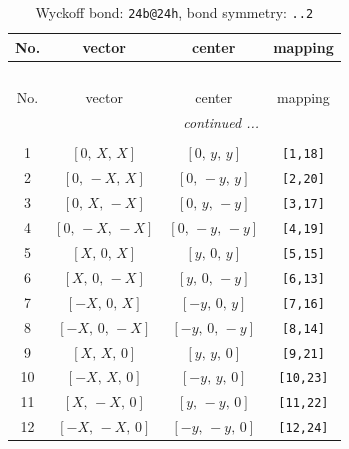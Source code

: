 \documentclass[fleqn,8pt]{jsarticle}
\begin{document}
\renewcommand{\arraystretch}{1.2}
\begin{longtable}{cccc}
\caption{Wyckoff bond: {\tt 24b@24h}, bond symmetry: {\tt ..2}}
 \\
 \hline \hline
No. & vector & center & mapping \\ \hline \endfirsthead

\multicolumn{3}{l}{\tablename\ \thetable{}} \\
 \hline \hline
No. & vector & center & mapping \\ \hline \endhead

 \hline \hline
\multicolumn{3}{r}{\footnotesize\it continued ...} \\ \endfoot

 \hline \hline
\multicolumn{3}{r}{} \\ \endlastfoot

1 & $\left[ 0,\, X,\, X \right]$ & $\left[ 0,\, y,\, y \right]$ & {\tt [1,18]} \\ \hline
2 & $\left[ 0,\, - X,\, X \right]$ & $\left[ 0,\, - y,\, y \right]$ & {\tt [2,20]} \\ \hline
3 & $\left[ 0,\, X,\, - X \right]$ & $\left[ 0,\, y,\, - y \right]$ & {\tt [3,17]} \\ \hline
4 & $\left[ 0,\, - X,\, - X \right]$ & $\left[ 0,\, - y,\, - y \right]$ & {\tt [4,19]} \\ \hline
5 & $\left[ X,\, 0,\, X \right]$ & $\left[ y,\, 0,\, y \right]$ & {\tt [5,15]} \\ \hline
6 & $\left[ X,\, 0,\, - X \right]$ & $\left[ y,\, 0,\, - y \right]$ & {\tt [6,13]} \\ \hline
7 & $\left[ - X,\, 0,\, X \right]$ & $\left[ - y,\, 0,\, y \right]$ & {\tt [7,16]} \\ \hline
8 & $\left[ - X,\, 0,\, - X \right]$ & $\left[ - y,\, 0,\, - y \right]$ & {\tt [8,14]} \\ \hline
9 & $\left[ X,\, X,\, 0 \right]$ & $\left[ y,\, y,\, 0 \right]$ & {\tt [9,21]} \\ \hline
10 & $\left[ - X,\, X,\, 0 \right]$ & $\left[ - y,\, y,\, 0 \right]$ & {\tt [10,23]} \\ \hline
11 & $\left[ X,\, - X,\, 0 \right]$ & $\left[ y,\, - y,\, 0 \right]$ & {\tt [11,22]} \\ \hline
12 & $\left[ - X,\, - X,\, 0 \right]$ & $\left[ - y,\, - y,\, 0 \right]$ & {\tt [12,24]} \\
\end{longtable}
\renewcommand{\arraystretch}{1.2}
\end{document}
